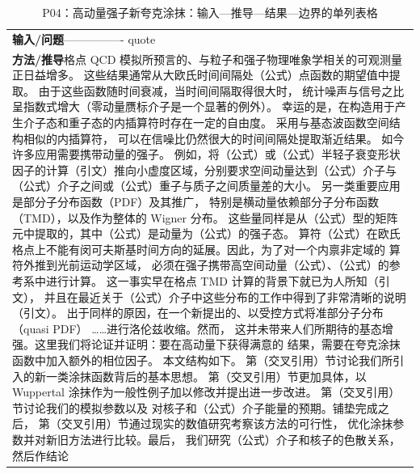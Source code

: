 \documentclass[UTF8,11pt,oneside]{ctexbook}
\begin{document}
\begin{table}[htbp]
  \centering
  \caption*{P04：高动量强子新夸克涂抹：输入—推导—结果—边界的单列表格}
  \small
  \begin{tabular}{@{}p{}@{}}
    \toprule
    \textbf{输入/问题}\quad —————- quote \\
    \textbf{方法/推导}\quad 格点 QCD 模拟所预言的、与粒子和强子物理唯象学相关的可观测量正日益增多。 这些结果通常从大欧氏时间间隔处（公式）点函数的期望值中提取。 由于这些函数随时间衰减，当时间间隔取得很大时， 统计噪声与信号之比呈指数式增大（零动量赝标介子是一个显著的例外）。 幸运的是，在构造用于产生介子态和重子态的内插算符时存在一定的自由度。 采用与基态波函数空间结构相似的内插算符， 可以在信噪比仍然很大的时间间隔处提取渐近结果。 如今许多应用需要携带动量的强子。 例如，将（公式）或（公式）半轻子衰变形状因子的计算（引文）推向小虚度区域，分别要求空间动量达到（公式）介子与（公式）介子之间或（公式）重子与质子之间质量差的大小。 另一类重要应用是部分子分布函数（PDF）及其推广， 特别是横动量依赖部分子分布函数（TMD），以及作为整体的 Wigner 分布。 这些量同样是从（公式）型的矩阵元中提取的，其中（公式）是动量为（公式）的强子态。 算符（公式）在欧氏格点上不能有闵可夫斯基时间方向的延展。因此，为了对一个内禀非定域的 算符外推到光前运动学区域， 必须在强子携带高空间动量（公式）、（公式）的参考系中进行计算。 这一事实早在格点 TMD 计算的背景下就已为人所知（引文）， 并且在最近关于（公式）介子中这些分布的工作中得到了非常清晰的说明（引文）。 出于同样的原因，在一个新提出的、以受控方式将准部分子分布（quasi PDF） ……进行洛伦兹收缩。然而， 这并未带来人们所期待的基态增强。这里我们将论证并证明：要在高动量下获得满意的 结果，需要在夸克涂抹函数中加入额外的相位因子。 本文结构如下。 第（交叉引用）节讨论我们所引入的新一类涂抹函数背后的基本思想。 第（交叉引用）节更加具体，以 Wuppertal 涂抹作为一般性例子加以修改并提出进一步改进。 第（交叉引用）节讨论我们的模拟参数以及 对核子和（公式）介子能量的预期。铺垫完成之后， 第（交叉引用）节通过现实的数值研究考察该方法的可行性， 优化涂抹参数并对新旧方法进行比较。最后， 我们研究（公式）介子和核子的色散关系，然后作结论 \\

\end{tabular}
\end{table}
\end{document}
